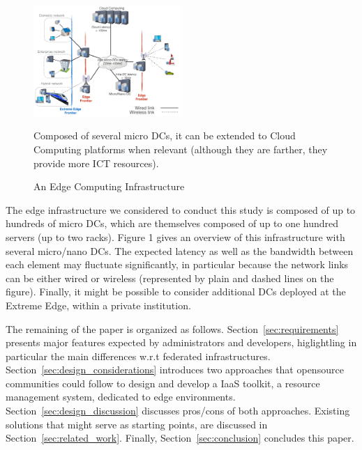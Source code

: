 \begin{figure}[]
  \centering
  \includegraphics[width=0.5\textwidth]{./figures/figure_fog.pdf}
  \caption{An Edge Computing Infrastructure~\cite{7923796}}
  \label{fig:fogedge-archi}
  {\small{Composed of several micro DCs, it can be extended to Cloud Computing platforms when relevant (although they are farther, they provide more ICT resources).}}
\end{figure}

The edge infrastructure we considered to conduct this study is
composed of up to hundreds of micro DCs, which are themselves composed
of up to one hundred servers (up to two racks).  Figure 1 gives an
overview of this infrastructure with several micro/nano DCs. The
expected latency as well as the bandwidth between each element may
fluctuate significantly, in particular because the network links can
be either wired or wireless (represented by plain and dashed lines on
the figure). Finally, it might be possible to consider additional DCs
deployed at the Extreme Edge, within a private institution.


The remaining of the paper is organized as
follows. Section~\ref{sec:requirements} presents major features expected by administrators and developers, higlightling in particular the main differences
w.r.t federated infrastructures.
Section~\ref{sec:design_considerations} introduces two approaches
that opensource communities could follow to design and develop a IaaS
toolkit, \aka a resource management system, dedicated to edge
environments. Section~\ref{sec:design_discussion} discusses pros/cons
of both approaches. Existing solutions that might serve as
starting points, are discussed in
Section~\ref{sec:related_work}. Finally, Section~\ref{sec:conclusion} concludes this paper.



